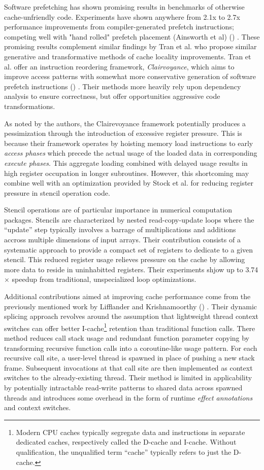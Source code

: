 \documentclass[nobib]{tufte-handout}
\newcommand{\CiteThis}{
({\color{red}{CITE THIS}})
}
\begin{document}
Software prefetching has shown promising results in benchmarks of otherwise cache-unfriendly code.  Experiments have shown anywhere from 2.1x to 2.7x performance improvements from compiler-generated prefetch instructions; competing well with "hand rolled" prefetch placement (Ainsworth et al) \CiteThis{}.  These promising results complement similar findings by Tran et al. who propose similar generative and transformative methods of cache locality improvements.  Tran et al. offer an instruction reordering framework, \emph{Clairvoyance}, which aims to improve access patterns with somewhat more conservative generation of software prefetch instructions \CiteThis{}.  Their methods more heavily rely upon dependency analysis to ensure correctness, but offer opportunities aggressive code transformations.

As noted by the authors, the Clairevoyance framework potentially produces a pessimization through the introduction of excessive register pressure.  This is because their framework operates by hoisting memory load instructions to early \emph{access phases} which precede the actual usage of the loaded data in corresponding \emph{execute phases}.  This aggregate loading combined with delayed usage results in high register occupation in longer subroutines.  However, this shortcoming may combine well with an optimization provided by Stock et al. for reducing register pressure in stencil operation code.  

Stencil operations are of particular importance in numerical computation packages.  Stencils are characterized by nested read-copy-update loops where the ``update'' step typically involves a barrage of multiplications and additions accross multiple dimensions of input arrays.  Their contribution consists of a systematic approach to provide a compact set of registers to dedicate to a given stencil.  This reduced register usage relieves pressure on the cache by allowing more data to reside in uninhabitted registers.  Their experiments shjow up to 3.74$\times$ speedup from traditional, unspecialized loop optimizations.  

Additional contributions aimed at improving cache performance come from the previously mentioned work by Lifflander and Krishnamoorthy \CiteThis{}.  Their dynamic splicing approach revolves around the assumption that lightweight thread context switches can offer better I-cache\footnote{Modern CPU caches typically segregate data and instructions in separate dedicated caches, respectively called the D-cache and I-cache.  Without qualification, the unqualified term ``cache'' typically refers to just the D-cache.} retention than traditional function calls.  There method reduces call stack usage and redundant function parameter copying by transforming recursive function calls into a coroutine-like usage pattern.  For each recursive call site, a user-level thread is spawned in place of pushing a new stack frame.  Subsequent invocations at that call site are then implemented as context switches to the already-existing thread.  Their method is limited in applicability by potentially intractable read-write patterns to shared data across spawned threads and introduces some overhead in the form of runtime \emph{effect annotations} and context switches. 
\end{document}
